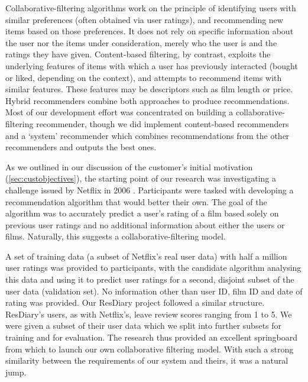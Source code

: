 \documentclass{l3proj}
\begin{document}
Collaborative-filtering algorithms work on the principle of identifying users with similar preferences (often obtained via user ratings), and recommending new items based on those preferences. It does not rely on specific information about the user nor the items under consideration, merely who the user is and the ratings they have given. Content-based filtering, by contrast, exploits the underlying features of items with which a user has previously interacted (bought or liked, depending on the context), and attempts to recommend items with similar features. These features may be descriptors such as film length or price. Hybrid recommenders combine both approaches to produce recommendations. Most of our development effort was concentrated on building a collaborative-filtering recommender, though we did implement content-based recommenders and a `system' recommender which combines recommendations from the other recommenders and outputs the best ones. 

As we outlined in our discussion of the customer’s initial motivation (\ref{sec:custobjectives}), the starting point of our research was investigating a challenge issued by Netflix in 2006 \cite{NetflixPrize}. Participants were tasked with developing a recommendation algorithm that would better their own. The goal of the algorithm was to accurately predict a user's rating of a film based solely on previous user ratings and no additional information about either the users or films. Naturally, this suggests a collaborative-filtering model.

A set of training data (a subset of Netflix's real user data) with half a million user ratings was provided to participants, with the candidate algorithm analysing this data and using it to predict user ratings for a second, disjoint subset of the user data (validation set). No information other than user ID, film ID and date of rating was provided. Our ResDiary project followed a similar structure. ResDiary's users, as with Netflix's, leave review scores ranging from 1 to 5. We were given a subset of their user data which we split into further subsets for training and for evaluation. The research thus provided an excellent springboard from which to launch our own collaborative filtering model. With such a strong similarity between the requirements of our system and theirs, it was a natural jump.
\end{document}
